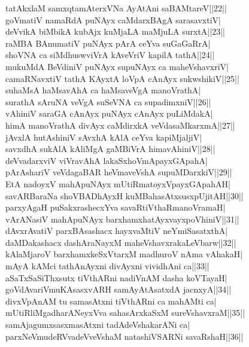 \documentclass{article}
\begin{document}
tatAkxlaM samxqtamAterxVNa AyAtAni saBAMtareV||22||\\
goVmatiV namaRdA puNAyx caMdarxBAgA sarasavxtiV|\\
deVvikA biMbikA kubAjx kuMjaLA maMjuLA surxtA||23||\\
raMBA BAnumatiV puNAyx pArA ceYva suGaGaRrA|\\
shoVNA ca siMdhuswviVrA kAveVriV kapilA tathA||24||\\
mukuMdA BeVdiniV puNAyx supuNAyx ca maheVshavxriV|\\
camaRNavxtiV tathA KAyxtA loVpA cAnAyx sukwshikiV||25||\\
suhaMsA haMsavAhA ca haMsaveVgA manoVrathA|\\
surathA sAruNA veVgA suSeVNA ca supadimxniV||26||\\
vAhiniV saraGA cAnAyx puNAyx cAnAyx puLiMdakA|\\
himA manoVrathA divAyx caMdirxkA veVdasaMkarxmA||27||\\
jAvxlA hutAshiniV sAvxhA kAlA ceYva kapiMjaljiV|\\
savxdhA sukAlA kAliMgA gaMBiVrA himavAhiniV||28||\\
deVvadarxviV viVravAhA lakaSxhoVmApayxGApahA|\\
pArAshariV veVdagaBAR heVmaveVshA supuMDarxkiV||29||\\
EtA nadoyxV mahApuNAyx mUtiRmatoyxVpayxGApahAH|\\
savARBaraNa shoVBADhAyxH kuMBahasAtxsusxpUjitAH||30||\\
parxyAgaH puSakxrashecxYva savaRtiVthaRmanoVramaH|\\
vArANasiV mahApuNAyx barxhamxhatAyxvayxpoVhiniV||31||\\
dAvxrAvatiV parxBAsashacx hayxvaMtiV neYmiSasatxthA|\\
daMDakashacx dashAraNayxM maheVshavxrakaLeVbarw||32||\\
kAlaMjaroV barxhamxkeSxVtarxM madhuroV nAma vAhakaH|\\
mAyA kAMci tathAnAyxni divAyxni vividhAni ca||33||\\
aSaTxSaSiThxsutx tiVthARni nadiVnAM dasha koVTayaH|\\
goVdAvariVmuKAsasxvARH samAyAtAsatxdA jacnxyA||34||\\
divxVpAnAM tu samasAtxni tiVthARni ca mahAMti ca|\\
mUtiRliMgadharANeyxVva sahasArxkaSxM sureVshavxraM||35||\\
samAjagumxsasxmasAtxni tadAdeVshakarANi ca|\\
parxNeVmudeRVvadeVveVshaM natashiVSARNi savaRshaH||36||\\
\end{document}
